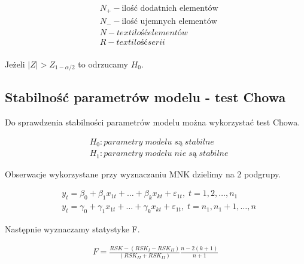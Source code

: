 \begin{equation}
    \begin{split}
        &N_+ - \text{ilość dodatnich elementów} \\
        &N_- - \text{ilość ujemnych elementów} \\
        &N - text{ilość elementów} \\
        &R - text{ilość serii} \\
    \end{split}
\end{equation}


Jeżeli \(|Z| > Z_{1-\alpha/2}\) to odrzucamy \(H_0\).

\subsection{Stabilność parametrów modelu - test Chowa}\label{subsec:stabilność-parametrów-modelu}

Do sprawdzenia stabilności parametrów modelu można wykorzystać test Chowa.

\begin{equation}
    \begin{split}
        &H_0: parametry \;  modelu \; są \; stabilne \\
        &H_1: parametry \;  modelu \; nie \; są \; stabilne
    \end{split}
\end{equation}

Obserwacje wykorzystane przy wyznaczaniu MNK dzielimy na 2 podgrupy.

\begin{equation}
    \begin{split}
        &y_t = \beta_0 + \beta_{1}x_{1t} + \dots + \beta_{k}x_{kt} + \varepsilon_{1t}, \;  t= 1,2, \dots , n_1  \\
        &y_t = \gamma_0 + \gamma_{1}x_{1t} + \dots + \gamma_{k}x_{kt} + \varepsilon_{1t}, \;  t= n_1,n_1 +1, \dots , n
    \end{split}
\end{equation}

Następnie wyznaczamy statystyke F.

\begin{equation}
    \begin{split}
        F = \frac{RSK - (RSK_I - RSK_{II})}{(RSK_{II}  + RSK_{II})} \frac{n-2(k+1)}{n+1}
    \end{split}
\end{equation}

